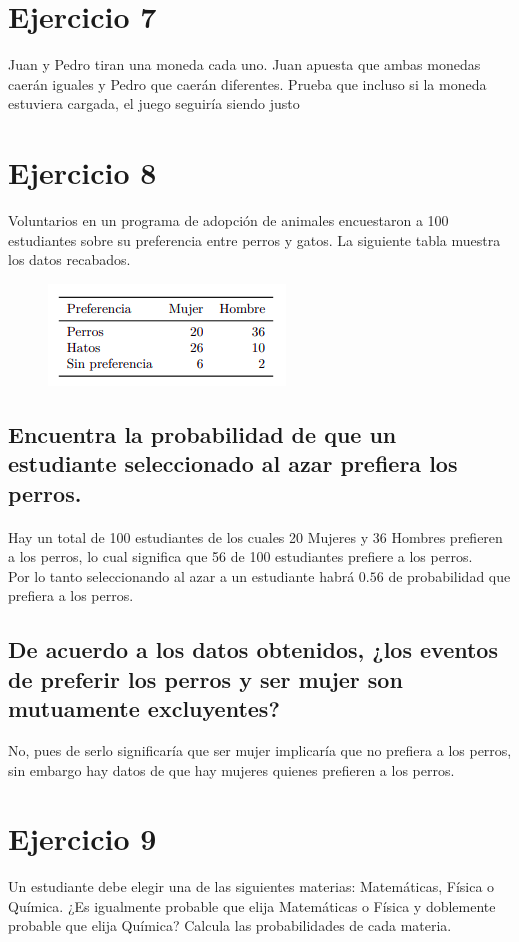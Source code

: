 \documentclass[12pt]{article}
\begin{document}
\section{Ejercicio 7}
Juan y Pedro tiran una moneda cada uno. Juan apuesta que ambas monedas caerán iguales
y Pedro que caerán diferentes. Prueba que incluso si la moneda estuviera cargada, el juego
seguiría siendo justo\\
\pagebreak
\section{Ejercicio 8} 
 Voluntarios en un programa de adopción de animales encuestaron a 100 estudiantes sobre su
preferencia entre perros y gatos. La siguiente tabla muestra los datos recabados.\\
\begin{figure}[h]
	\begin{center}
		\includegraphics[scale=0.85]{table}
	\end{center}
\end{figure}
\subsection{Encuentra la probabilidad de que un estudiante seleccionado al azar prefiera los perros.}
\paragraph{} Hay un total de 100 estudiantes de los cuales 20 Mujeres y 36 Hombres prefieren a los perros, lo cual significa que 56 de 100 estudiantes prefiere a los perros.\\
Por lo tanto seleccionando al azar a un estudiante habrá $0.56$ de probabilidad que prefiera a los perros. 
\subsection{De acuerdo a los datos obtenidos, ¿los eventos de preferir los perros y ser mujer son mutuamente excluyentes?}
No, pues de serlo significaría que ser mujer implicaría que no prefiera a los perros, sin embargo hay datos de que hay mujeres quienes prefieren a los perros.
\section{Ejercicio 9}
Un estudiante debe elegir una de las siguientes materias: Matemáticas, Física o Química. ¿Es
igualmente probable que elija Matemáticas o Física y doblemente probable que elija Química?
Calcula las probabilidades de cada materia.
\end{document}
